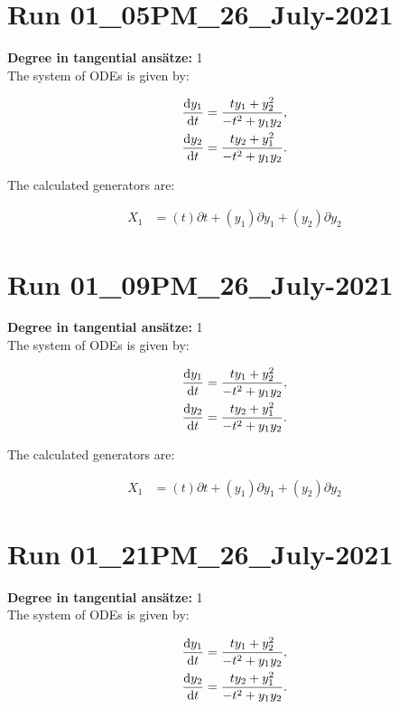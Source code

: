 \section*{Run 01\_05PM\_26\_July-2021}
\textbf{Degree in tangential ansätze:}	1\\
The system of ODEs is given by:

\begin{align*}
\dv{y_{1}}{t}&=\frac{t y_{1} + y_{2}^{2}}{- t^{2} + y_{1} y_{2}},\\
\dv{y_{2}}{t}&=\frac{t y_{2} + y_{1}^{2}}{- t^{2} + y_{1} y_{2}}.\\
\end{align*}

\noindent The calculated generators are:

\begin{align*}
X_{1}&=\left( t \right)\partial t+\left( y_{1} \right)\partial y_{1}+\left( y_{2} \right)\partial y_{2}\end{align*}
\section*{Run 01\_09PM\_26\_July-2021}
\textbf{Degree in tangential ansätze:}	1\\
The system of ODEs is given by:

\begin{align*}
\dv{y_{1}}{t}&=\frac{t y_{1} + y_{2}^{2}}{- t^{2} + y_{1} y_{2}},\\
\dv{y_{2}}{t}&=\frac{t y_{2} + y_{1}^{2}}{- t^{2} + y_{1} y_{2}}.\\
\end{align*}

\noindent The calculated generators are:

\begin{align*}
X_{1}&=\left( t \right)\partial t+\left( y_{1} \right)\partial y_{1}+\left( y_{2} \right)\partial y_{2}\end{align*}
\section*{Run 01\_21PM\_26\_July-2021}
\textbf{Degree in tangential ansätze:}	1\\
The system of ODEs is given by:

\begin{align*}
\dv{y_{1}}{t}&=\frac{t y_{1} + y_{2}^{2}}{- t^{2} + y_{1} y_{2}},\\
\dv{y_{2}}{t}&=\frac{t y_{2} + y_{1}^{2}}{- t^{2} + y_{1} y_{2}}.\\
\end{align*}

